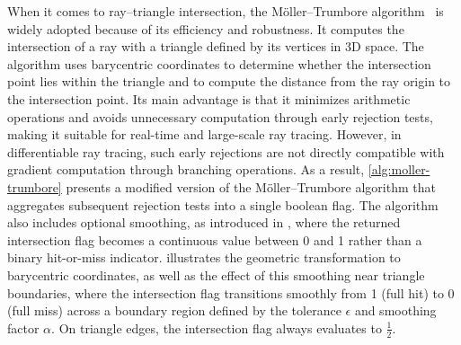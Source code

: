 When it comes to ray--triangle intersection, the Möller--Trumbore algorithm~ is widely adopted because of its efficiency and robustness. It computes the intersection of a ray with a triangle defined by its vertices in 3D space. The algorithm uses barycentric coordinates to determine whether the intersection point lies within the triangle and to compute the distance from the ray origin to the intersection point. Its main advantage is that it minimizes arithmetic operations and avoids unnecessary computation through early rejection tests, making it suitable for real-time and large-scale ray tracing. However, in differentiable ray tracing, such early rejections are not directly compatible with gradient computation through branching operations. As a result, \cref{alg:moller-trumbore} presents a modified version of the Möller--Trumbore algorithm that aggregates subsequent rejection tests into a single boolean flag. The algorithm also includes optional smoothing, as introduced in , where the returned intersection flag becomes a continuous value between 0 and 1 rather than a binary hit-or-miss indicator.  illustrates the geometric transformation to barycentric coordinates, as well as the effect of this smoothing near triangle boundaries, where the intersection flag transitions smoothly from 1 (full hit) to 0 (full miss) across a boundary region defined by the tolerance $\epsilon$ and smoothing factor $\alpha$. On triangle edges, the intersection flag always evaluates to $\tfrac{1}{2}$.


